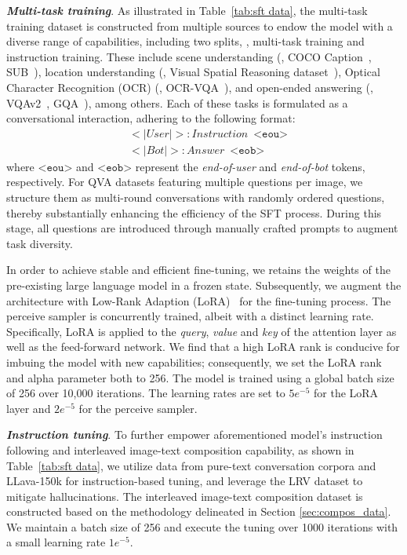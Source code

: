 \documentclass[10pt,twocolumn,letterpaper]{article}
\begin{document}
\textbf{\emph{Multi-task training}}. As illustrated in Table~\ref{tab:sft data}, the multi-task training dataset is constructed from multiple sources to endow the model with a diverse range of capabilities, including two splits, \ie, multi-task training and instruction training.
These include scene understanding (\eg, COCO Caption~\cite{chen2015microsoft}, SUB~\cite{Ordonez_2011_im2text}), location understanding (\eg, Visual Spatial Reasoning dataset~\cite{Liu2022VisualSR}), Optical Character Recognition (OCR) (\eg, OCR-VQA~\cite{mishraICDAR19}), and open-ended answering (\eg, VQAv2~\cite{VQAv2}, GQA~\cite{hudson2018gqa}), among others. Each of these tasks is formulated as a conversational interaction, adhering to the following format:
\begin{align*}
& <|User|>: \textit{Instruction} \enspace \texttt{<eou>} \\
& <|Bot|>: \textit{Answer} \enspace \texttt{<eob>}
\end{align*}
where $\texttt{<eou>}$ and $\texttt{<eob>}$ represent the \textit{end-of-user} and \textit{end-of-bot} tokens, respectively. For QVA datasets featuring multiple questions per image, we structure them as multi-round conversations with randomly ordered questions, thereby substantially enhancing the efficiency of the SFT process. During this stage, all questions are introduced through manually crafted prompts to augment task diversity. 


In order to achieve stable and efficient fine-tuning, we retains the weights of the pre-existing large language model in a frozen state. Subsequently, we augment the architecture with Low-Rank Adaption (LoRA)~\cite  {hu2022lora} for the fine-tuning process. The perceive sampler is concurrently trained, albeit with a distinct learning rate. Specifically, LoRA is applied to the \textit{query}, \textit{value} and \textit{key} of the attention layer as well as the feed-forward network. We find that a high LoRA rank is conducive for imbuing the model with new capabilities; consequently, we set the LoRA rank and alpha parameter both to 256. The model is trained using a global batch size of 256 over 10,000 iterations. The learning rates are set to $5e^{-5}$ for the LoRA layer and $2e^{-5}$ for the perceive sampler.

\textbf{\emph{Instruction tuning}}. To further empower aforementioned model's instruction following and interleaved image-text composition capability, as shown in Table~\ref{tab:sft data}, we utilize data from pure-text conversation corpora and LLava-150k for instruction-based tuning, and leverage the LRV dataset to mitigate hallucinations. The interleaved image-text composition dataset is constructed based on the methodology delineated in Section \ref{sec:compos_data}. We maintain a batch size of 256 and execute the tuning over 1000 iterations with a small learning rate $1e^{-5}$.
\end{document}
